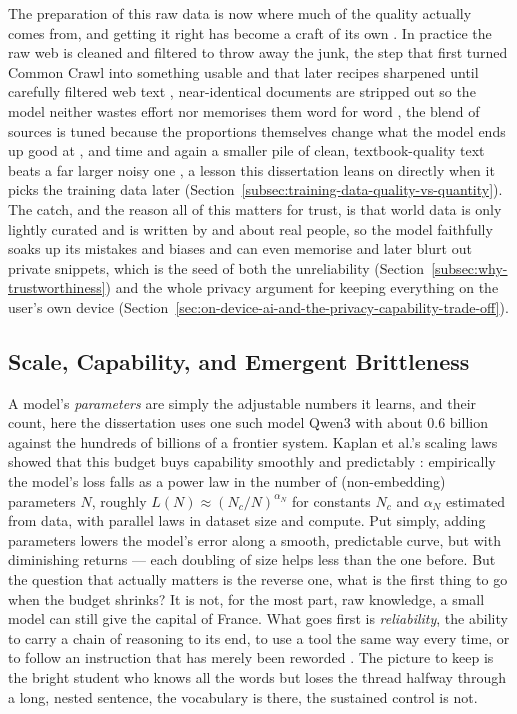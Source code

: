 The preparation of this raw data is now where much of the quality actually comes from, and getting it right has become a craft of its own \cite{liang2026nextgenerationllmtrainingdatacentric}. In practice the raw web is cleaned and filtered to throw away the junk, the step that first turned Common Crawl \cite{commoncrawl} into something usable \cite{raffel2023exploringlimitstransferlearning} and that later recipes sharpened until carefully filtered web text \cite{penedo2024finewebdatasetsdecantingweb}, near-identical documents are stripped out so the model neither wastes effort nor memorises them word for word \cite{lee2022deduplicatingtrainingdatamakes}, the blend of sources is tuned because the proportions themselves change what the model ends up good at \cite{xie2023doremioptimizingdatamixtures}, and time and again a smaller pile of clean, textbook-quality text beats a far larger noisy one \cite{gunasekar2023textbooksneed}, a lesson this dissertation leans on directly when it picks the training data later (Section~\ref{subsec:training-data-quality-vs-quantity}). The catch, and the reason all of this matters for trust, is that world data is only lightly curated and is written by and about real people, so the model faithfully soaks up its mistakes and biases and can even memorise and later blurt out private snippets, which is the seed of both the unreliability  (Section~\ref{subsec:why-trustworthiness}) and the whole privacy argument for keeping everything on the user's own device (Section~\ref{sec:on-device-ai-and-the-privacy-capability-trade-off}).

\subsection{Scale, Capability, and Emergent Brittleness}
\label{subsec:scale-capability}

A model's \emph{parameters} are simply the adjustable numbers it learns, and their count, here the dissertation uses one such model Qwen3 with about 0.6 billion against the hundreds of billions of a frontier system. Kaplan et al.'s scaling laws showed that this budget buys capability smoothly and predictably \cite{kaplan2020scalinglawsneurallanguage}: empirically the model's loss falls as a power law in the number of (non-embedding) parameters $N$, roughly $L(N) \approx (N_c / N)^{\alpha_N}$ for constants $N_c$ and $\alpha_N$ estimated from data, with parallel laws in dataset size and compute. Put simply, adding parameters lowers the model's error along a smooth, predictable curve, but with diminishing returns --- each doubling of size helps less than the one before. But the question that actually matters is the reverse one, what is the first thing to go when the budget shrinks? It is not, for the most part, raw knowledge, a small model can still give the capital of France. What goes first is \emph{reliability}, the ability to carry a chain of reasoning to its end, to use a tool the same way every time, or to follow an instruction that has merely been reworded \cite{rainone2025replacingthinkingtoolusage}. The picture to keep is the bright student who knows all the words but loses the thread halfway through a long, nested sentence, the vocabulary is there, the sustained control is not.

